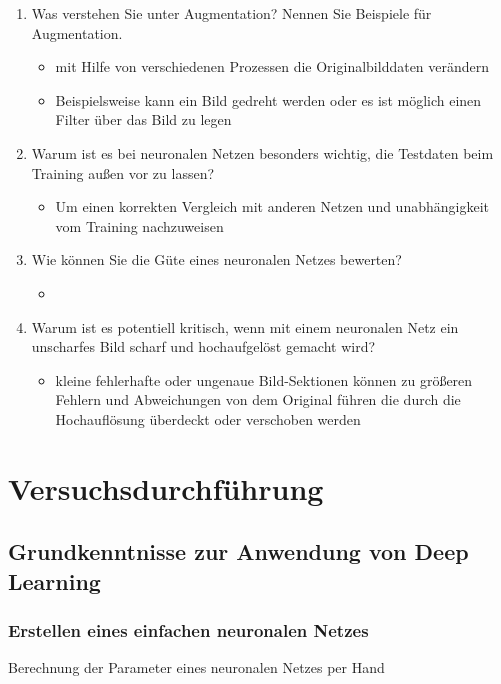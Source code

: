 \documentclass[a4paper,12pt,titlepage]{scrartcl}
\begin{document}
\begin{enumerate}
    \item Was verstehen Sie unter Augmentation? Nennen Sie Beispiele für Augmentation.
          \begin{itemize}
              \item mit Hilfe von verschiedenen Prozessen die Originalbilddaten verändern
              \item Beispielsweise kann ein Bild gedreht werden oder es ist möglich einen Filter über das Bild zu legen
          \end{itemize}
    \item Warum ist es bei neuronalen Netzen besonders wichtig, die Testdaten beim Training außen vor zu lassen?
          \begin{itemize}
              \item Um einen korrekten Vergleich mit anderen Netzen und unabhängigkeit vom Training nachzuweisen
          \end{itemize}
    \item Wie können Sie die Güte eines neuronalen Netzes bewerten?
          \begin{itemize}
              \item 
          \end{itemize}
    \item Warum ist es potentiell kritisch, wenn mit einem neuronalen Netz ein unscharfes Bild scharf und hochaufgelöst gemacht wird?
          \begin{itemize}
              \item kleine fehlerhafte oder ungenaue Bild-Sektionen können zu größeren Fehlern und Abweichungen von dem Original führen die durch die Hochauflösung überdeckt oder verschoben werden
          \end{itemize}
\end{enumerate}

\section{Versuchsdurchführung}
\subsection{Grundkenntnisse zur Anwendung von Deep Learning}
\subsubsection{Erstellen eines einfachen neuronalen Netzes}
Berechnung der Parameter eines neuronalen Netzes per Hand
\end{document}
